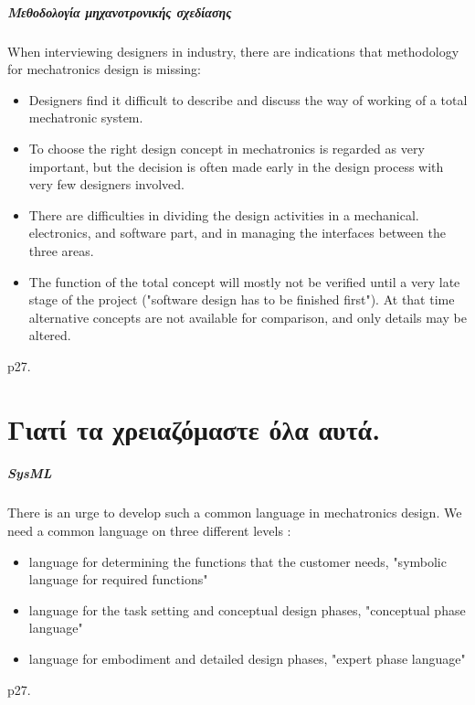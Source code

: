 \documentclass[a4paper,12pt,twoside]{report}
\begin{document}
{			\paragraph{Μεθοδολογία μηχανοτρονικής σχεδίασης}{When interviewing designers in industry, there are indications that methodology for mechatronics design is missing:
			\begin{itemize}
				\item Designers find it difficult to describe and discuss the way of working of a total mechatronic system.
				\item To choose the right design concept in mechatronics is regarded as very important, but the decision is often made early in the design process with very few designers involved.
				\item There are difficulties in dividing the design activities in a mechanical. electronics, and software part, and in managing the interfaces between the three areas.
				\item The function of the total concept will mostly not be verified until a very late stage of the project ("software design has to be finished first"). At that time alternative concepts are not available for comparison, and only details may be altered.
			\end{itemize}
			\cite{ATheoreticalApproachOnMechatronicsDesign:Buur1990} p27.
			}
			
	\chapter{Γιατί τα χρειαζόμαστε όλα αυτά.}
		\label{κεφ.:Γιατί τα χρειαζόμαστε όλα αυτά.}
		
		\paragraph{SysML}{There is an urge to develop such a common language in mechatronics design. We need a common language on three different levels :
		\begin{itemize}
			\item language for determining the functions that the customer needs, "symbolic language for required functions"
			\item language for the task setting and conceptual design phases, "conceptual phase language"
			\item language for embodiment and detailed design phases, "expert phase language"
			\end{itemize}
			\cite{ATheoreticalApproachOnMechatronicsDesign:Buur1990} p27.
		}
		
}
\end{document}
